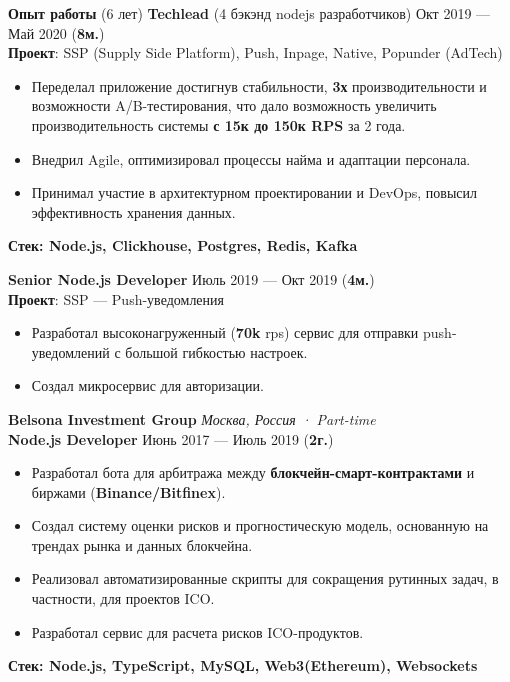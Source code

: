 \documentclass{resume}
\begin{document}
\begin{rSection}{\textbf{Опыт работы} (6 лет) }
    \textbf{Techlead} (4 бэкэнд nodejs разработчиков) \hfill Окт 2019 --- Май 2020 ({\textbf{8м.}}) \\
    \textbf{Проект}: SSP (Supply Side Platform), Push, Inpage, Native, Popunder (AdTech)
    \begin{itemize}
        \item Переделал приложение достигнув стабильности, \textbf{3х} производительности и возможности A/B-тестирования,
        что дало возможность увеличить производительность системы \textbf{с 15к до 150к RPS} за 2 года\@.
        \item Внедрил Agile, оптимизировал процессы найма и адаптации персонала\@.
        \item Принимал участие в архитектурном проектировании и DevOps, повысил эффективность хранения данных\@.
    \end{itemize}
    \textbf{Стек: Node.js, Clickhouse, Postgres, Redis, Kafka}
    \clearpage

    \textbf{Senior Node.js Developer} \hfill Июль 2019 --- Окт 2019 ({\textbf{4м.}}) \\
    \textbf{Проект}: SSP --- Push-уведомления
    \begin{itemize}
        \item Разработал высоконагруженный (\textbf{70k} rps) сервис для отправки push-уведомлений с большой гибкостью настроек\@.
        \item Создал микросервис для авторизации\@.
    \end{itemize}

    \textbf{Belsona Investment Group} \hfill \textit{Москва, Россия · Part-time} \\
    \textbf{Node.js Developer}  \hfill Июнь 2017 --- Июль 2019 ({\textbf{2г.}})
    \begin{itemize}
        \item Разработал бота для арбитража между \textbf{блокчейн-смарт-контрактами} и биржами (\textbf{Binance/Bitfinex})\@.
        \item Создал систему оценки рисков и прогностическую модель, основанную на трендах рынка и данных блокчейна\@.
        \item Реализовал автоматизированные скрипты для сокращения рутинных задач, в частности, для проектов ICO\@.
        \item Разработал сервис для расчета рисков ICO-продуктов\@.
    \end{itemize}
    \textbf{Стек: Node.js, TypeScript, MySQL, Web3(Ethereum), Websockets}

\end{rSection}
\end{document}
